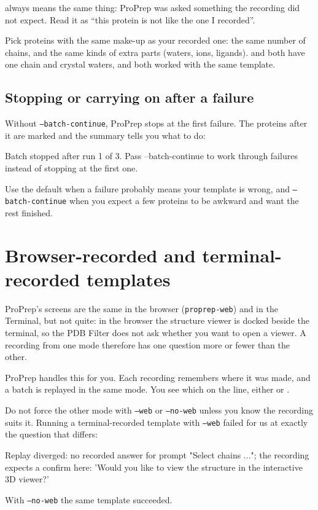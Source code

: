  always means the same thing: ProPrep was asked
something the recording did not expect. Read it as ``this protein is not like
the one I recorded''.

\begin{tip}
Pick proteins with the same make-up as your recorded one: the same number of
chains, and the same kinds of extra parts (waters, ions, ligands). 
and  both have one chain and crystal waters, and both worked with
the same template.
\end{tip}

\subsection{Stopping or carrying on after a failure}

Without \texttt{--batch-continue}, ProPrep stops at the first failure. The
proteins after it are marked  and the summary tells you
what to do:

\begin{screen}
Batch stopped after run 1 of 3. Pass --batch-continue to work through
failures instead of stopping at the first one.
\end{screen}

Use the default when a failure probably means your template is wrong, and
\texttt{--batch-continue} when you expect a few proteins to be awkward and
want the rest finished.

\section{Browser-recorded and terminal-recorded templates}

ProPrep's screens are the same in the browser (\texttt{proprep-web}) and in
the Terminal, but not quite: in the browser the structure viewer is docked
beside the terminal, so the PDB Filter does not ask whether you want to open
a viewer. A recording from one mode therefore has one question more or fewer
than the other.

ProPrep handles this for you. Each recording remembers where it was made, and
a batch is replayed in the same mode. You see which on the
 line, either  or
.

\begin{watchout}
Do not force the other mode with \texttt{--web} or \texttt{--no-web} unless
you know the recording suits it. Running a terminal-recorded template with
\texttt{--web} failed for us at exactly the question that differs:
\begin{screen}
Replay diverged: no recorded answer for prompt "Select chains ..."; the
recording expects a confirm here: 'Would you like to view the structure in
the interactive 3D viewer?'
\end{screen}
With \texttt{--no-web} the same template succeeded.
\end{watchout}

